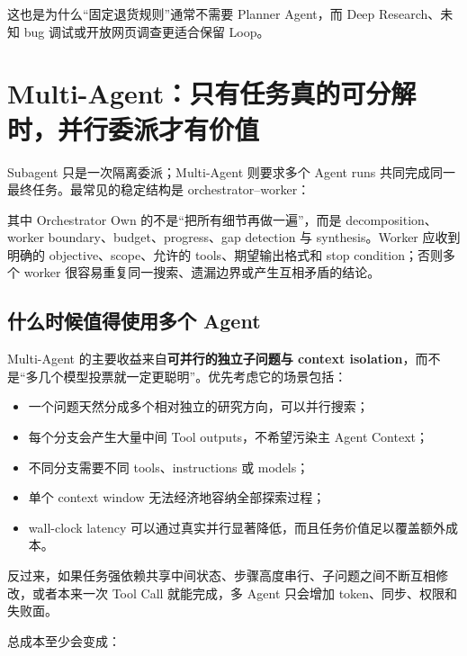 \documentclass[profile=standard,twoside=false]{ipara-handbook}
\begin{document}
这也是为什么“固定退货规则”通常不需要 Planner Agent，而 Deep Research、未知 bug 调试或开放网页调查更适合保留 Loop。

\section{Multi-Agent：只有任务真的可分解时，并行委派才有价值}

Subagent 只是一次隔离委派；Multi-Agent 则要求多个 Agent runs 共同完成同一最终任务。最常见的稳定结构是 orchestrator--worker：

\begin{processchain}
\end{processchain}

其中 Orchestrator Own 的不是“把所有细节再做一遍”，而是 decomposition、worker boundary、budget、progress、gap detection 与 synthesis。Worker 应收到明确的 objective、scope、允许的 tools、期望输出格式和 stop condition；否则多个 worker 很容易重复同一搜索、遗漏边界或产生互相矛盾的结论。

\subsection{什么时候值得使用多个 Agent}

Multi-Agent 的主要收益来自\textbf{可并行的独立子问题与 context isolation}，而不是“多几个模型投票就一定更聪明”。优先考虑它的场景包括：

\begin{itemize}
  \item 一个问题天然分成多个相对独立的研究方向，可以并行搜索；
  \item 每个分支会产生大量中间 Tool outputs，不希望污染主 Agent Context；
  \item 不同分支需要不同 tools、instructions 或 models；
  \item 单个 context window 无法经济地容纳全部探索过程；
  \item wall-clock latency 可以通过真实并行显著降低，而且任务价值足以覆盖额外成本。
\end{itemize}

反过来，如果任务强依赖共享中间状态、步骤高度串行、子问题之间不断互相修改，或者本来一次 Tool Call 就能完成，多 Agent 只会增加 token、同步、权限和失败面。

总成本至少会变成：
\end{document}
